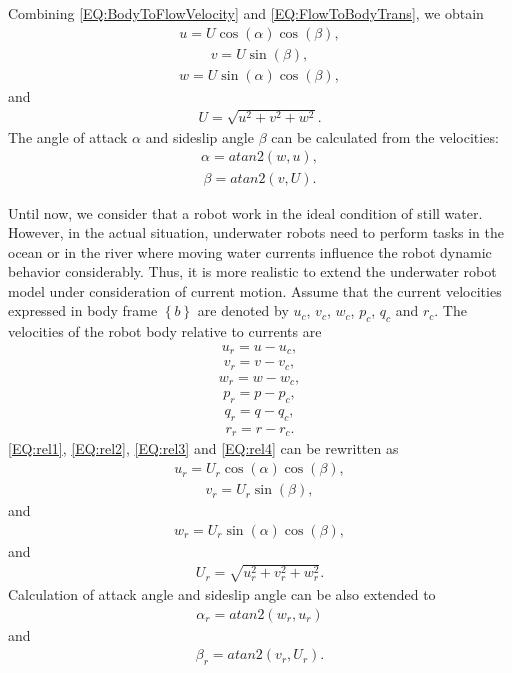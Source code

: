 Combining \ref{EQ:BodyToFlowVelocity} and \ref{EQ:FlowToBodyTrans}, we obtain
\begin{align}
u=U\cos(\alpha)\cos(\beta)\label{EQ:rel1},
\end{align}
\begin{align}
v=U\sin(\beta)\label{EQ:rel2},
\end{align}
\begin{align}
w=U\sin(\alpha)\cos(\beta)\label{EQ:rel3},
\end{align}
and
\begin{align}
U=\sqrt{u^{2}+v^{2}+w^{2}}\label{EQ:rel4}.
\end{align}
The angle of attack $\alpha$ and sideslip angle $\beta$ can be calculated from the velocities:
\begin{align}
\alpha=atan2(w,u),
\end{align}
\begin{align}
\beta=atan2(v,U).
\end{align}

Until now, we consider that a robot work in the ideal condition of still water. However, in the actual situation, underwater robots need to perform tasks in the ocean or in the river where moving water currents influence the robot dynamic behavior considerably. Thus, it is more realistic to extend the underwater robot model under consideration of current motion. Assume that the current velocities expressed in body frame $\left\{ b \right\}$ are denoted by $u_{c}$, $v_{c}$, $w_{c}$, $p_{c}$, $q_{c}$ and $r_{c}$. The velocities of the robot body relative to currents are
\begin{align}
u_{r}=u-u_{c},
\end{align}
\begin{align}
v_{r}=v-v_{c},
\end{align}
\begin{align}
w_{r}=w-w_{c},
\end{align}
\begin{align}
p_{r}=p-p_{c},
\end{align}
\begin{align}
q_{r}=q-q_{c},
\end{align}
\begin{align}
r_{r}=r-r_{c}.
\end{align}
\ref{EQ:rel1}, \ref{EQ:rel2}, \ref{EQ:rel3} and \ref{EQ:rel4} can be rewritten as
\begin{align}
u_{r}=U_{r}\cos(\alpha)\cos(\beta),
\end{align}
\begin{align}
v_{r}=U_{r}\sin(\beta),
\end{align}
and
\begin{align}
w_{r}=U_{r}\sin(\alpha)\cos(\beta),
\end{align}
and
\begin{align}
U_{r}=\sqrt{u_{r}^{2}+v_{r}^{2}+w_{r}^{2}}.
\end{align}
Calculation of attack angle and sideslip angle can be also extended to
\begin{align}
\alpha_{r}=atan2(w_{r},u_{r})
\end{align}
and
\begin{align}
\beta_{r}=atan2(v_{r},U_{r}).
\end{align}

